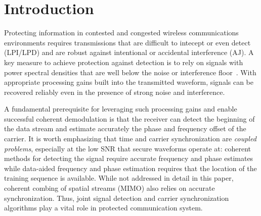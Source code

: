 \section{Introduction}%
\label{sec:introduction}


Protecting information in contested and congested wireless
communications environments requires transmissions that are difficult
to intecept or even detect (LPI/LPD) and are robust against
intentional or accidental interference (AJ).
A key measure to achieve protection against detection is to rely on
signals with power spectral densities that are well below the noise or
interference floor~\cite{Yan_LPD}.
With appropriate processing gains built into the transmitted waveform, signals can be
recovered reliably even in the presence of strong noise and
interference.

A fundamental prerequisite for leveraging such processing gains and
enable successful coherent demodulation is that the receiver can
detect the beginning of the data stream and estimate accurately the phase and frequency offset of the carrier.
It is worth emphasizing that time and carrier synchronization are
\emph{coupled problems}, especially at the low SNR that secure
waveforms operate at:
coherent methods for detecting the signal require accurate frequency and phase estimates 
while data-aided frequency and phase estimation requires that the
location of the training sequence is available.
While not addressed in detail in this paper, coherent combing of
spatial streams (MIMO) also relies on accurate synchronization.
Thus, joint signal detection and carrier synchronization algorithms
play a vital role in protected communication system.

